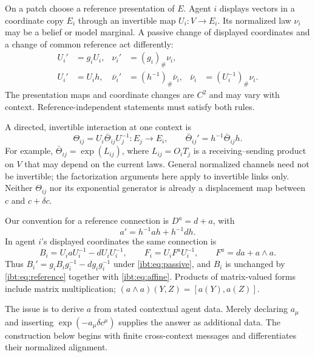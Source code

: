 On a patch choose a reference presentation of $E$. Agent $i$ displays vectors in a coordinate copy $E_i$ through an invertible map $U_i:V\to E_i$. Its normalized law $\nu_i$ may be a belief or model marginal. A passive change of displayed coordinates and a change of common reference act differently:
\begin{align}
 U_i'&=g_iU_i,&\nu_i'&=(g_i)_\#\nu_i,
 \label{ibt:eq:passive}\\
 U_i'&=U_i h,&\bar\nu_i'&=(h^{-1})_\#\bar\nu_i,
 &\bar\nu_i&=(U_i^{-1})_\#\nu_i.
 \label{ibt:eq:reference}
\end{align}
The presentation maps and coordinate changes are $C^2$ and may vary with context. Reference-independent statements must satisfy both rules.

A directed, invertible interaction at one context is
\begin{equation}
 \Theta_{ij}=U_i \bar\Theta_{ij}U_j^{-1}:E_j\longrightarrow E_i,
 \qquad \bar\Theta_{ij}'=h^{-1}\bar\Theta_{ij}h.
 \label{ibt:eq:point-link}
\end{equation}
For example, $\bar\Theta_{ij}=\exp(L_{ij})$, where $L_{ij}=O_iT_j$ is a receiving--sending product on $V$ that may depend on the current laws. General normalized channels need not be invertible; the factorization arguments here apply to invertible links only. Neither $\Theta_{ij}$ nor its exponential generator is already a displacement map between $c$ and $c+\delta c$.

Our convention for a reference connection is $D^a=d+a$, with
\begin{equation}
 a'=h^{-1}ah+h^{-1}d h.
 \label{ibt:eq:affine}
\end{equation}
In agent $i$'s displayed coordinates the same connection is
\begin{equation}
 B_i=U_i aU_i^{-1}-d U_iU_i^{-1},\qquad
 F_i=U_i F^aU_i^{-1},\qquad F^a=d a+a\wedge a.
 \label{ibt:eq:dressed}
\end{equation}
Thus $B_i'=g_iB_ig_i^{-1}-d g_i g_i^{-1}$ under \cref{ibt:eq:passive}, and $B_i$ is unchanged by \cref{ibt:eq:reference} together with \cref{ibt:eq:affine}. Products of matrix-valued forms include matrix multiplication; $(a\wedge a)(Y,Z)=[a(Y),a(Z)]$.

The issue is to derive $a$ from stated contextual agent data. Merely declaring $a_\mu$ and inserting $\exp(-a_\mu\delta c^\mu)$ supplies the answer as additional data. The construction below begins with finite cross-context messages and differentiates their normalized alignment.

